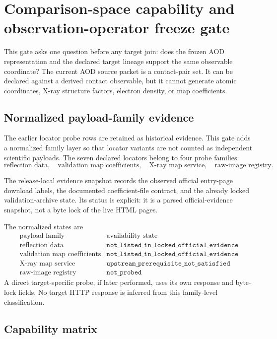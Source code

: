 \section{Comparison-space capability and observation-operator freeze gate}

This gate asks one question before any target join: does the frozen AOD representation and the declared target lineage support the same observable coordinate?  The current AOD source packet is a contact-pair set.  It can be declared against a derived contact observable, but it cannot generate atomic coordinates, X-ray structure factors, electron density, or map coefficients.

\subsection{Normalized payload-family evidence}

The earlier locator probe rows are retained as historical evidence.  This gate adds a normalized family layer so that locator variants are not counted as independent scientific payloads.  The seven declared locators belong to four probe families:
\[
\text{reflection data},\quad
\text{validation map coefficients},\quad
\text{X-ray map service},\quad
\text{raw-image registry}.
\]

The release-local evidence snapshot records the observed official entry-page download labels, the documented coefficient-file contract, and the already locked validation-archive state.  Its status is explicit: it is a parsed official-evidence snapshot, not a byte lock of the live HTML pages.

The normalized states are
\[
\begin{array}{c|c}
\text{payload family} & \text{availability state}\\ \hline
\text{reflection data} & \texttt{not\_listed\_in\_locked\_official\_evidence}\\
\text{validation map coefficients} & \texttt{not\_listed\_in\_locked\_official\_evidence}\\
\text{X-ray map service} & \texttt{upstream\_prerequisite\_not\_satisfied}\\
\text{raw-image registry} & \texttt{not\_probed}
\end{array}
\]
A direct target-specific probe, if later performed, uses its own response and byte-lock fields.  No target HTTP response is inferred from this family-level classification.

\subsection{Capability matrix}

